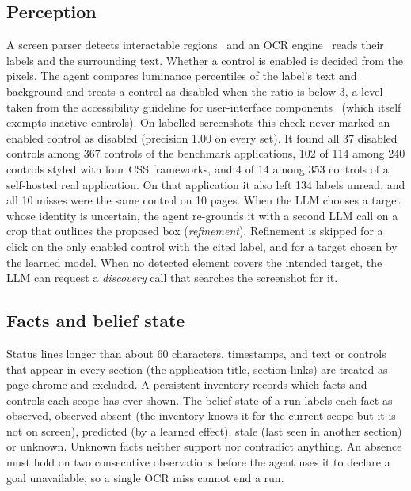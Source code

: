 \documentclass[conference]{IEEEtran}
\begin{document}
\subsection{Perception}
A screen parser detects interactable regions~\cite{lu2024omniparser} and an OCR engine~\cite{du2020ppocr} reads their labels and the surrounding text. Whether a control is enabled is decided from the pixels. The agent compares luminance percentiles of the label's text and background and treats a control as disabled when the ratio is below 3, a level taken from the accessibility guideline for user-interface components~\cite{wcag21} (which itself exempts inactive controls). On labelled screenshots this check never marked an enabled control as disabled (precision 1.00 on every set). It found all 37 disabled controls among 367 controls of the benchmark applications, 102 of 114 among 240 controls styled with four CSS frameworks, and 4 of 14 among 353 controls of a self-hosted real application. On that application it also left 134 labels unread, and all 10 misses were the same control on 10 pages. When the LLM chooses a target whose identity is uncertain, the agent re-grounds it with a second LLM call on a crop that outlines the proposed box (\emph{refinement}). Refinement is skipped for a click on the only enabled control with the cited label, and for a target chosen by the learned model. When no detected element covers the intended target, the LLM can request a \emph{discovery} call that searches the screenshot for it.

\subsection{Facts and belief state}
Status lines longer than about 60 characters, timestamps, and text or controls that appear in every section (the application title, section links) are treated as page chrome and excluded. A persistent inventory records which facts and controls each scope has ever shown. The belief state of a run labels each fact as observed, observed absent (the inventory knows it for the current scope but it is not on screen), predicted (by a learned effect), stale (last seen in another section) or unknown. Unknown facts neither support nor contradict anything. An absence must hold on two consecutive observations before the agent uses it to declare a goal unavailable, so a single OCR miss cannot end a run.
\end{document}
